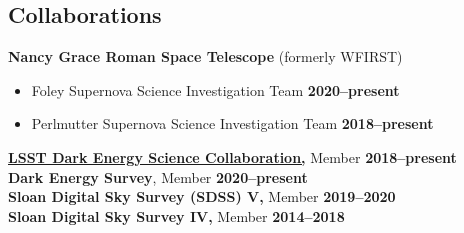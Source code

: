 \documentclass[margin]{res}
\begin{document}
\begin{resume}





\section{Collaborations}
{\bf Nancy Grace Roman Space Telescope} (formerly WFIRST)
\begin{itemize}\itemsep -2pt
 \item[] Foley Supernova Science Investigation Team \hfill {\bf 2020--present}
 \item[] Perlmutter Supernova Science Investigation Team \hfill {\bf 2018--present}
\end{itemize} \vspace{-12pt}
{\bf \href{http://www.lsst-desc.org}{LSST Dark Energy Science Collaboration,}} Member \hfill {\bf 2018--present}\\
{\bf Dark Energy Survey}, Member \hfill {\bf 2020--present}\\
{\bf Sloan Digital Sky Survey (SDSS) V,} Member \hfill {\bf 2019--2020}\\
{\bf Sloan Digital Sky Survey IV,} Member \hfill {\bf 2014--2018}





\end{resume}
\end{document}
